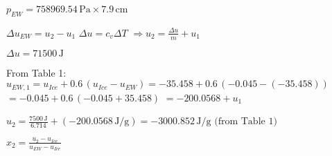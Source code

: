 \( p_{EW} = 758969.54 \, \text{Pa} \times 7.9 \, \text{cm} \)

\( \Delta u_{EW} = u_2 - u_1 \)  
\( \Delta u = c_v \Delta T \)  
\( \Rightarrow u_2 = \frac{\Delta u}{m} + u_1 \)

\( \Delta u = 71500 \, \text{J} \)

From Table 1:  
\( u_{EW,1} = u_{Ice} + 0.6 \, (u_{Ice} - u_{EW}) = -35.458 + 0.6 \, (-0.045 - (-35.458)) \)  
\( = -0.045 + 0.6 \, (-0.045 + 35.458) \)  
\( = -200.0568 + u_1 \)

\( u_2 = \frac{7500 \, \text{J}}{6.714} + (-200.0568 \, \text{J/g}) = -3000.852 \, \text{J/g} \)  
\( \text{(from Table 1)} \)

\( x_2 = \frac{u_2 - u_{Ice}}{u_{EW} - u_{Ice}} \)